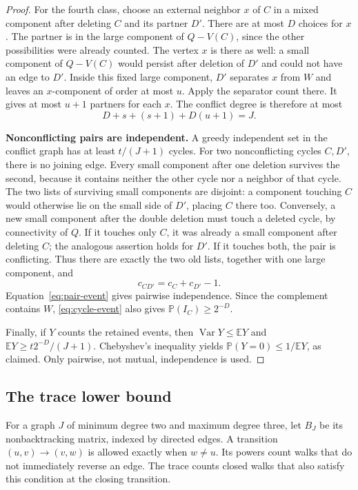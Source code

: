 \documentclass[11pt,a4paper]{article}
\numberwithin{equation}{section}
\theoremstyle{definition}
\theoremstyle{remark}
\newcommand{\E}{\mathbb E}
\newcommand{\Prob}{\mathbb P}
\newcommand{\proofstep}[1]{\par\addvspace{\medskipamount}\noindent\textbf{#1}\enspace\ignorespaces}
\DeclareMathOperator{\Var}{Var}
\begin{document}
\begin{proof}
For the fourth class, choose an external neighbor $x$ of $C$ in a mixed component after deleting $C$ and its partner $D'$. There are at most $D$ choices for $x$. The partner is in the large component of $Q-V(C)$, since the other possibilities were already counted. The vertex $x$ is there as well: a small component of $Q-V(C)$ would persist after deletion of $D'$ and could not have an edge to $D'$. Inside this fixed large component, $D'$ separates $x$ from $W$ and leaves an $x$-component of order at most $u$. Apply the separator count there. It gives at most $u+1$ partners for each $x$. The conflict degree is therefore at most
\[
 D+s+(s+1)+D(u+1)=J.
\]

\proofstep{Nonconflicting pairs are independent.}
A greedy independent set in the conflict graph has at least $t/(J+1)$ cycles. For two nonconflicting cycles $C,D'$, there is no joining edge. Every small component after one deletion survives the second, because it contains neither the other cycle nor a neighbor of that cycle. The two lists of surviving small components are disjoint: a component touching $C$ would otherwise lie on the small side of $D'$, placing $C$ there too. Conversely, a new small component after the double deletion must touch a deleted cycle, by connectivity of $Q$. If it touches only $C$, it was already a small component after deleting $C$; the analogous assertion holds for $D'$. If it touches both, the pair is conflicting. Thus there are exactly the two old lists, together with one large component, and
\[
 c_{CD'}=c_C+c_{D'}-1.
\]
Equation~\eqref{eq:pair-event} gives pairwise independence. Since the complement contains $W$, \eqref{eq:cycle-event} also gives $\Prob(I_C)\ge2^{-D}$.

Finally, if $Y$ counts the retained events, then $\Var Y\le\E Y$ and $\E Y\ge t2^{-D}/(J+1)$. Chebyshev's inequality yields $\Prob(Y=0)\le1/\E Y$, as claimed. Only pairwise, not mutual, independence is used.
\end{proof}

\subsection{The trace lower bound}
For a graph $J$ of minimum degree two and maximum degree three, let $B_J$ be its nonbacktracking matrix, indexed by directed edges. A transition $(u,v)\to(v,w)$ is allowed exactly when $w\ne u$. Its powers count walks that do not immediately reverse an edge. The trace counts closed walks that also satisfy this condition at the closing transition.
\end{document}
